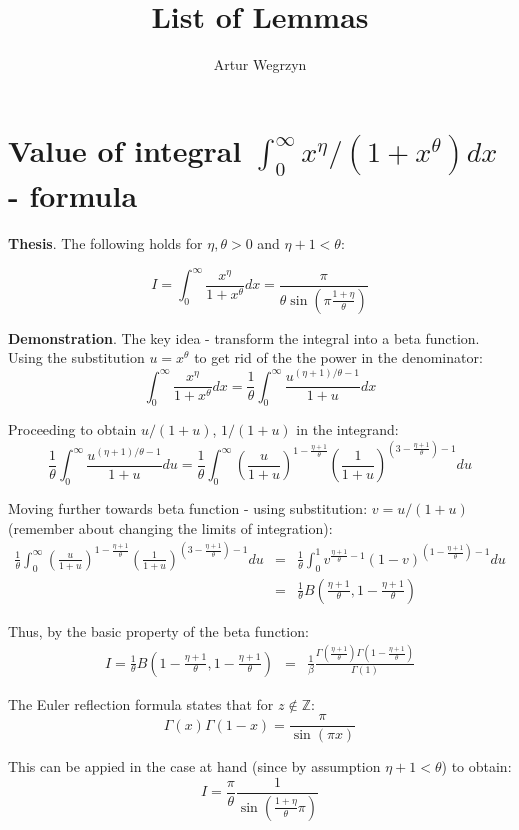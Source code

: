 \documentclass[12pt]{article}
\theoremstyle{plain}
\theoremstyle{definition}
\begin{document}
\title{List of Lemmas}
\author{Artur Wegrzyn}
\maketitle

\tableofcontents

\newpage

\section{Value of integral $\int_{0}^{\infty} x^{\eta}/(1+x^{\theta})dx$ - formula}


\textbf{Thesis}. The following holds for $\eta, \theta >0$ and $\eta+1 < \theta$:

\begin{equation*}
I = \int_{0}^{\infty} \frac{x^{\eta}}{1+x^{\theta}}dx = \frac{\pi}{\theta \sin \left( \pi \frac{1+\eta}{\theta} \right)}
\end{equation*}

\textbf{Demonstration}. The key idea - transform the integral into a beta function. Using the substitution $u = x^{\theta}$ to get rid of the 
the power in the denominator:
\begin{equation*}
\int_{0}^{\infty} \frac{x^{\eta}}{1+x^{\theta}}dx = \frac{1}{\theta} \int_{0}^{\infty} \frac{u^{(\eta+1)/\theta-1}}{1+u}dx
\end{equation*}

Proceeding to obtain $u/(1+u)$, $1/(1+u)$ in the integrand:
\begin{equation*}
\frac{1}{\theta} \int_{0}^{\infty} \frac{u^{(\eta+1)/\theta-1}}{1+u}du = 
\frac{1}{\theta} 
\int_{0}^{\infty} 
\left( \frac{u}{1+u} \right)^{{1 - \frac{\eta + 1}{\theta}}} 
\left( \frac{1}{1+u} \right)^{(3 - \frac{\eta + 1}{\theta}) - 1} du
\end{equation*}

Moving further towards beta function - using substitution: $v = u/(1+u)$ (remember about changing the limits of integration):
\begin{eqnarray*}
\frac{1}{\theta} 
\int_{0}^{\infty} 
\left( \frac{u}{1+u} \right)^{{1 - \frac{\eta + 1}{\theta}}} 
\left( \frac{1}{1+u} \right)^{(3 - \frac{\eta + 1}{\theta}) - 1} du &=& 
\frac{1}{\theta} 
\int_{0}^{1} 
v^{\frac{\eta + 1}{\theta} - 1} 
\left( 1-v \right)^{
	(1 - \frac{\eta + 1}{\theta}) - 1
} du \\ &=& 
\frac{1}{\theta} B(\frac{\eta + 1}{\theta}, 1 - \frac{\eta + 1}{\theta})
\end{eqnarray*}

Thus, by the basic property of the beta function:
\begin{eqnarray*}
I = \frac{1}{\theta} B(1 - \frac{\eta + 1}{\theta}, 1 - \frac{\eta + 1}{\theta}) &=& 
\frac{1}{\beta} \frac{\Gamma(\frac{\eta + 1}{\theta})\Gamma(1 - \frac{\eta + 1}{\theta})}{\Gamma(1)} 
\end{eqnarray*}

The Euler reflection formula states that for $z \notin \mathbb{Z}$:
$$ 
\Gamma(x) \Gamma(1-x) = \frac{\pi}{\sin (\pi x)}
$$

This can be appied in the case at hand (since by assumption $\eta + 1 < \theta$) to obtain:
$$
I = \frac{\pi}{\theta} \frac{1}{\sin (\frac{1+\eta}{\theta} \pi)}
$$
\end{document}
